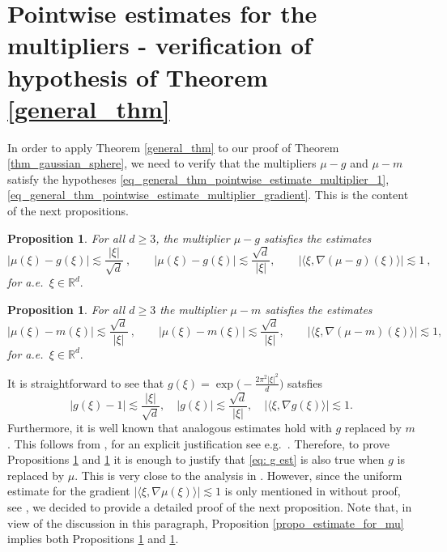 \documentclass[a4paper, reqno]{amsart}
\newtheorem{proposition}[thm]{Proposition}
\theoremstyle{definition}
\newcommand{\R}{{\mathbb R}}
\begin{document}
\section{ Pointwise estimates for the multipliers - verification of hypothesis of Theorem \ref{general_thm}}
\label{sec: pointmult}

In order to apply Theorem \ref{general_thm} to our proof of Theorem \ref{thm_gaussian_sphere}, we need to verify that the multipliers $\mu-g$ and $\mu -m$ satisfy the hypotheses \eqref{eq_general_thm_pointwise_estimate_multiplier_1}, \eqref{eq_general_thm_pointwise_estimate_multiplier_gradient}. This is the content of the next propositions.
\begin{proposition}\label{propo_estimate_for_mu_minus_g}
For all $d\geq 3$, the multiplier $\mu-g$ satisfies the estimates 
\begin{equation*}
    |\mu(\xi)-g(\xi)|\lesssim\frac{|\xi|}{\sqrt{d}}~, \qquad |\mu(\xi)-g(\xi)|\lesssim \frac{\sqrt{d}}{|\xi|},\qquad 
    |\langle \xi, \nabla(\mu-g)(\xi) \rangle | \lesssim 1~,
\end{equation*}
for a.e.\ $\xi\in \R^d.$
\end{proposition}
\begin{proposition}\label{propo_estimates_mu_minus_m}
For all $d\ge 3$ the multiplier $\mu-m$ satisfies the estimates 
\begin{equation*}
    |\mu(\xi)-m(\xi)|\lesssim \frac{\sqrt{d}} {|\xi|} ~,
\qquad
    |\mu(\xi)-m(\xi)|\lesssim\frac{\sqrt{d}}{|\xi|},\qquad
    \vert \langle \xi, \nabla(\mu-m)(\xi)\rangle \vert \lesssim 1,
\end{equation*}
for a.e.\ $\xi\in \R^d.$
\end{proposition}

It is straightforward to see that $g(\xi)  =\exp\big(-\tfrac{2\pi^2|\xi|^2}{d}\big)$ satsfies
\begin{equation}
\label{eq: g est}
|g(\xi)-1|\lesssim \frac{|\xi|}{\sqrt{d}},\quad |g(\xi)|\lesssim \frac{\sqrt{d}}{|\xi|},\quad  |\langle \xi, \nabla g(\xi) \rangle | \lesssim 1. 
\end{equation}
Furthermore, it is well known that analogous estimates hold with $g$ replaced by $m$. This follows from \cite{B86}, for an explicit justification see e.g.\ \cite[Lemma 2.11]{BMSW20}. Therefore, to prove Propositions \ref{propo_estimate_for_mu_minus_g} and \ref{propo_estimates_mu_minus_m} it is enough to justify that \eqref{eq: g est} is also true when $g$ is replaced by $\mu.$ This is very close to the analysis in \cite[Section 4]{MSW24}. However, since the uniform estimate for the gradient $ |\langle \xi, \nabla \mu(\xi) \rangle | \lesssim 1$ is only mentioned in \cite{MSW24}  without proof, see \cite[eq.\ (5.20)]{MSW24}, we decided to provide a detailed proof of the next proposition. Note that,  in view of the discussion in this paragraph, Proposition \ref{propo_estimate_for_mu} implies both Propositions \ref{propo_estimate_for_mu_minus_g} and \ref{propo_estimates_mu_minus_m}.
\end{document}
